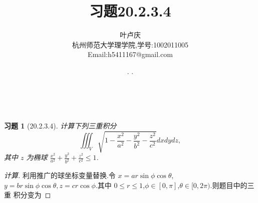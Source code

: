 \documentclass[a4paper, 12pt]{article} %
\makeatletter
\newtheorem*{cdtheorem}{习题}
\newenvironment{exercise}
{\bigskip\begin{mdframed}[backgroundcolor=gray!40,rightline=false,leftline=false,topline=false,bottomline=false]\begin{cdtheorem}}
    {\end{cdtheorem}\end{mdframed}\bigskip}
\renewcommand{\maketitle}{ %
  \renewcommand\refname{参考文献}
  \newcommand{\D}{\displaystyle}\newcommand{\ri}{\Rightarrow}
  \newcommand{\ds}{\displaystyle} \renewcommand{\ni}{\noindent}
  \newcommand{\pa}{\partial} \newcommand{\Om}{\Omega}
  \newcommand{\om}{\omega} \newcommand{\sik}{\sum_{i=1}^k}
  \newcommand{\vov}{\Vert\omega\Vert} \newcommand{\Umy}{U_{\mu_i,y^i}}
  \newcommand{\lamns}{\lambda_n^{^{\scriptstyle\sigma}}}
  \newcommand{\chiomn}{\chi_{_{\Omega_n}}}
  \newcommand{\ullim}{\underline{\lim}} \newcommand{\bsy}{\boldsymbol}
  \newcommand{\mvb}{\mathversion{bold}} \newcommand{\la}{\lambda}
  \newcommand{\La}{\Lambda} \newcommand{\va}{\varepsilon}
  \newcommand{\be}{\beta} \newcommand{\al}{\alpha}
  \newcommand{\dis}{\displaystyle} \newcommand{\R}{{\mathbb R}}
  \newcommand{\N}{{\mathbb N}} \newcommand{\cF}{{\mathcal F}}
  \newcommand{\gB}{{\mathfrak B}} \newcommand{\eps}{\epsilon}
  \begin{flushright} %
    {\LARGE\@title} %
    
    \vspace{50pt} %
    
    {\large\@author} %
    \\\@date %
    
    \vspace{40pt} %
  \end{flushright}
}
\makeatother
\begin{document}
\begin{CJK}{UTF8}{gkai}
  \title{\textbf{习题20.2.3.4}} 
  \author{\small{叶卢庆}\\{\small{杭州师范大学理学院,学号:1002011005}}\\{\small{Email:h5411167@gmail.com}}} %
  \renewcommand{\today}{\number\year. \number\month. \number\day}
  \date{\today} %
  
  
  
  \maketitle %
  
  
  
  
  
  
  
  \begin{exercise}[20.2.3.4]
计算下列三重积分
$$
\iiint_V \sqrt{1-\frac{x^2}{a^2}-\frac{y^2}{b^2}-\frac{z^2}{c^2}}dxdydz,
$$
其中 $z$ 为椭球 $\frac{x^2}{a^2}+\frac{y^2}{b^2}+\frac{z^2}{c^2}\leq 1$.    
  \end{exercise}
  \begin{proof}[计算]
利用推广的球坐标变量替换.令
$x=ar\sin\phi\cos\theta$,$y=br\sin\phi\cos\theta,z=cr\cos\phi$.其中
$0\leq r\leq 1$,$\phi\in [0,\pi]$,$\theta\in [0,2\pi)$.则题目中的三重
积分变为


\end{proof}
\end{CJK}
\end{document}
